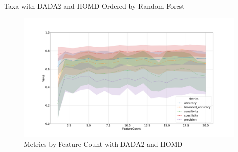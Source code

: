 \documentclass[a4paper]{article}
\begin{document}
            \begin{table}[p]
                \centering
                \caption{Taxa with DADA2 and HOMD Ordered by Random Forest}
                \label{tb:RF-whole-dada2-homd}

            \end{table}

            \begin{figure}[p]
                \centering
                \includegraphics[width=0.7 \linewidth]{figures/RandomForest/ANCOM.DADA2.homd/metrics.png}
                \caption{Metrics by Feature Count with DADA2 and HOMD}
                \label{fig:RF-every-metrics-DADA2-homd}
            \end{figure}
\end{document}
